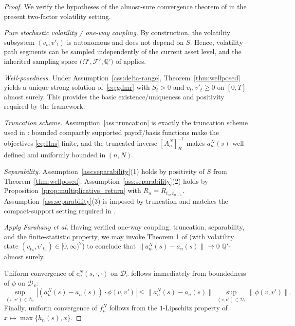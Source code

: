 \documentclass[10pt]{article}
\theoremstyle{plain}
\theoremstyle{definition}
\theoremstyle{remark}
\begin{document}
\begin{proof}
We verify the hypotheses of the almost-sure convergence theorem of \citet{farahany2020mixing}
in the present two-factor volatility setting.

\smallskip
\noindent\emph{Pure stochastic volatility / one-way coupling.}
By construction, the volatility subsystem $(v_t,v'_t)$ is autonomous and does not depend on $S$.
Hence, volatility path segments can be sampled independently of the current asset level, and the inherited sampling space
$\bigl(\Omega',\mathcal{F}',\mathbb{Q}'\bigr)$ of \citet{farahany2020mixing} applies.

\smallskip
\noindent\emph{Well-posedness.}
Under Assumption~\ref{ass:delta-range}, Theorem~\ref{thm:wellposed} yields a unique strong solution of~\eqref{eq:gdmr} with
$S_t>0$ and $v_t,v'_t\ge 0$ on $[0,T]$ almost surely. This provides the basic existence/uniqueness and positivity required by the framework.

\smallskip
\noindent\emph{Truncation scheme.}
Assumption~\ref{ass:truncation} is exactly the truncation scheme used in \cite{farahany2020mixing}: bounded compactly supported
payoff/basis functions make the objectives \eqref{eq:Hns} finite, and the truncated inverse $[A_n^N]^{-1}_R$ makes $a_n^N(s)$
well-defined and uniformly bounded in $(n,N)$.

\smallskip
\noindent\emph{Separability.}
Assumption~\ref{ass:separability}(1) holds by positivity of $S$ from Theorem~\ref{thm:wellposed}.
Assumption~\ref{ass:separability}(2) holds by Proposition~\ref{prop:multiplicative_return} with $R_n=R_{t_n,t_{n+1}}$.
Assumption~\ref{ass:separability}(3) is imposed by truncation and matches the compact-support setting required in \cite{farahany2020mixing}.

\smallskip
\noindent\emph{Apply Farahany et al.}
Having verified one-way coupling, truncation, separability, and the finite-statistic property, we may invoke
Theorem 1 of \citet{farahany2020mixing}(with volatility state $(v_{t_n},v'_{t_n})\in[0,\infty)^2$) to conclude that
$\|a_n^N(s)-a_n(s)\|\to 0$ $\mathbb{Q}'$-almost surely.

Uniform convergence of $c_n^N(s,\cdot,\cdot)$ on $\mathcal{D}_v$ follows immediately from boundedness of $\phi$ on $\mathcal{D}_v$:
\[
\sup_{(v,v')\in\mathcal{D}_v} |(a_n^N(s)-a_n(s))\cdot\phi(v,v')|
\le \|a_n^N(s)-a_n(s)\|\ \sup_{(v,v')\in\mathcal{D}_v}\|\phi(v,v')\|.
\]
Finally, uniform convergence of $f_n^N$ follows from the $1$-Lipschitz property of $x\mapsto \max\{h_n(s),x\}$.
\end{proof}
\end{document}
